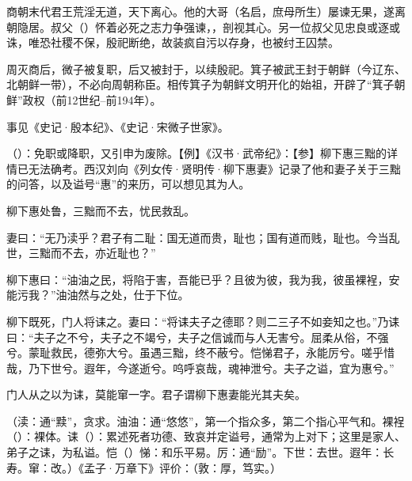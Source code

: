 \bigskip

{
\item {}商朝末代君王荒淫无道，天下离心。他的大哥（名启，庶母所生）屡谏无果，遂离朝隐居。叔父（）怀着必死之志力争强谏，，剖视其心。另一位叔父见忠良或逐或诛，唯恐社稷不保，殷祀断绝，故装疯自污以存身，也被纣王囚禁。%

周灭商后，微子被复职，后又被封于，以续殷祀。箕子被武王封于朝鲜（今辽东、北朝鲜一带），不必向周朝称臣。相传箕子为朝鲜文明开化的始祖，开辟了“箕子朝鲜”政权（前12世纪--前194年）。

事见《史记·殷本纪》、《史记·宋微子世家》。
}
{}


{
\item {}（）：免职或降职，又引申为废除。【例】《汉书·武帝纪》：【参】柳下惠三黜的详情已无法确考。西汉刘向《列女传·贤明传·柳下惠妻》记录了他和妻子关于三黜的问答，以及谥号“惠”的来历，可以想见其为人。
\begin{lyquotepara}
柳下惠处鲁，三黜而不去，忧民救乱。

妻曰：“无乃渎乎？君子有二耻：国无道而贵，耻也；国有道而贱，耻也。今当乱世，三黜而不去，亦近耻也？”

柳下惠曰：“油油之民，将陷于害，吾能已乎？且彼为彼，我为我，彼虽裸裎，安能污我？”油油然与之处，仕于下位。

柳下既死，门人将诔之。妻曰：“将诔夫子之德耶？则二三子不如妾知之也。”乃诔曰：“夫子之不兮，夫子之不竭兮，夫子之信诚而与人无害兮。屈柔从俗，不强兮。蒙耻救民，德弥大兮。虽遇三黜，终不蔽兮。恺悌君子，永能厉兮。嗟乎惜哉，乃下世兮。遐年，今遂逝兮。呜呼哀哉，魂神泄兮。夫子之谥，宜为惠兮。”

门人从之以为诔，莫能窜一字。君子谓柳下惠妻能光其夫矣。
\end{lyquotepara}
（渎：通“黩”，贪求。油油：通“悠悠”，第一个指众多，第二个指心平气和。裸裎（）：裸体。诔（）：累述死者功德、致哀并定谥号，通常为上对下；这里是家人、弟子之诔，为私谥。恺（）悌：和乐平易。厉：通“励”。下世：去世。遐年：长寿。窜：改。）《孟子·万章下》评价：（敦：厚，笃实。）
}
{}



